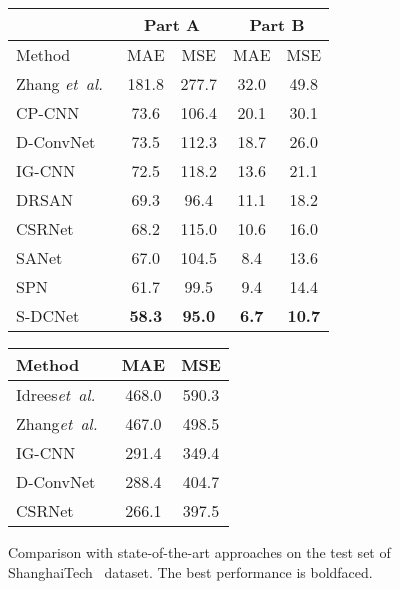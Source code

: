 \documentclass[10pt,twocolumn,letterpaper]{article}
\begin{document}
	
	\begin{figure*}
		\begin{minipage}{\textwidth}
			
\makeatletter{}\makeatother
			\begin{minipage}{.38\textwidth}
				\centering
				\footnotesize
				\begin{tabular}{|l|c|c|c|c|}
					\hline
					&\multicolumn{2}{c|}{Part A} &
					\multicolumn{2}{c|}{Part B}\\
					\hline
					Method & MAE &MSE& MAE &MSE\\
					\hline
					Zhang \textit{et~al.}~\cite{Zhang_2015_CVPR}&181.8&277.7&32.0&49.8\\
CP-CNN~\cite{CPCNN_2017_ICCV} &73.6 & 106.4 &20.1&30.1\\
					D-ConvNet~\cite{DeepNegCor_2018_CVPR} &73.5	&112.3&18.7	&26.0\\
					IG-CNN~\cite{Divide_grow_2018_CVPR}&72.5	&118.2	&13.6&21.1\\
					DRSAN~\cite{DRSAN2018Crowd}&69.3	&96.4 &11.1&18.2\\
					CSRNet~\cite{CSRNet_2018_CVPR}&68.2 & 115.0 &10.6&16.0\\
					SANet~\cite{SANet_2018_ECCV}&67.0	&104.5 &8.4&13.6\\
					SPN~\cite{SPN_2019_WACV}&61.7&99.5&9.4&14.4\\
\hline
					S-DCNet & \textbf{58.3} & \textbf{95.0}& \textbf{6.7}	  & \textbf{10.7}  \\	   
					\hline
				\end{tabular}  
				\vspace{5pt}
				\caption{Comparison with state-of-the-art approaches on the test set of ShanghaiTech~\cite{MCNN_2016_CVPR} dataset. The best performance is boldfaced.}
				\label{tab:compare_SHAB}
			\end{minipage}
			\hfill
\makeatletter{}\makeatother
			\begin{minipage}{.25\textwidth}
				\centering
				\footnotesize
				\begin{tabular}{|l|c|c|}
					\hline
					Method & MAE &MSE\\
					\hline
					Idrees\textit{et~al.}~\cite{UCFCC50_2013_CVPR}&468.0&590.3\\
					Zhang\textit{et~al.}~\cite{Zhang_2015_CVPR}&467.0&498.5\\
					IG-CNN~\cite{Divide_grow_2018_CVPR}&291.4&349.4\\
					D-ConvNet~\cite{DeepNegCor_2018_CVPR}&288.4&404.7\\
					CSRNet~\cite{CSRNet_2018_CVPR}&266.1& 397.5\\
					

\end{tabular}
\end{minipage}
\end{minipage}
\end{figure*}
\end{document}

